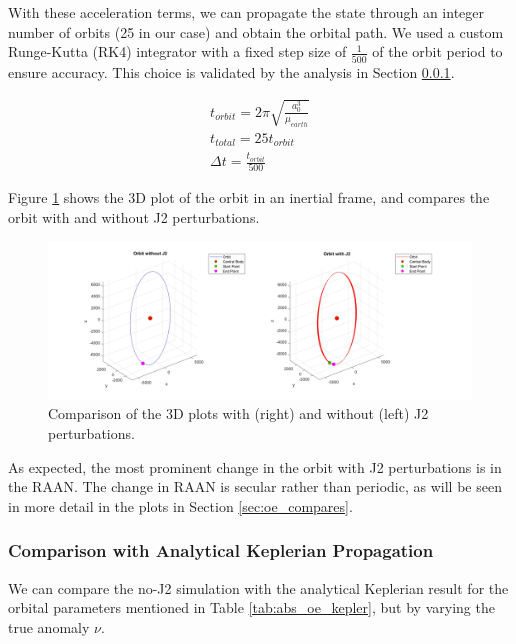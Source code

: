 With these acceleration terms, we can propagate the state through an integer number of orbits (25 in our case) and obtain the orbital path. We used a custom Runge-Kutta (RK4) integrator with a fixed step size of $\frac{1}{500}$ of the orbit period to ensure accuracy. This choice is validated by the analysis in Section \ref{sec:analytical_and_eci2rtn}.

\begin{align}
    t_{orbit} = 2\pi \sqrt{\frac{a_0^3}{\mu_{earth}}} \\
    t_{total} = 25t_{orbit} \\
    \Delta t = \frac{t_{orbit}}{500} \label{eq:timestep}%
\end{align}

Figure \ref{fig:3d_plots_with_j2} shows the 3D plot of the orbit in an inertial frame, and compares the orbit with and without J2 perturbations.

\begin{figure}[H]
    \centering
    \includegraphics[width=1.1\linewidth]{PS1/Figures/Orbit_J2_Comparison_ECI.jpg}
    \caption{Comparison of the 3D plots with (right) and without (left) J2 perturbations. }
    \label{fig:3d_plots_with_j2}
\end{figure}

As expected, the most prominent change in the orbit with J2 perturbations is in the RAAN. The change in RAAN is secular rather than periodic, as will be seen in more detail in the plots in Section \ref{sec:oe_compares}.

\subsubsection{Comparison with Analytical Keplerian Propagation} \label{sec:analytical_and_eci2rtn}

We can compare the no-J2 simulation with the analytical Keplerian result for the orbital parameters mentioned in Table \ref{tab:abs_oe_kepler}, but by varying the true anomaly $\nu$. 

